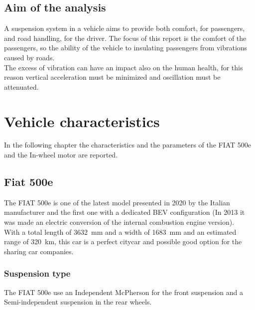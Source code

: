 \documentclass{article}
\numberwithin{equation}{section}
\numberwithin{figure}{section}
\numberwithin{table}{section}
\numberwithin{table}{section}
\begin{document}
\subsection{Aim of the analysis}
A suspension system in a vehicle aims to provide both comfort, for passengers, and road handling, for the driver. The focus of this report is the comfort of the passengers, so the ability of the vehicle to insulating passengers from vibrations caused by roads.\\
The excess of vibration can have an impact also on the human health, for this reason vertical acceleration must be minimized and oscillation must be attenuated.


\section{Vehicle characteristics}
In the following chapter the characteristics and the parameters of the FIAT 500e and the In-wheel motor are reported.

\subsection{Fiat 500e}
The FIAT 500e is one of the latest model presented in 2020 by the Italian manufacturer and the first one with a dedicated BEV configuration (In 2013 it was made an electric conversion of the internal combustion engine version).\\
With a total length of \SI{3632}{\milli\metre} and a width of \SI{1683}{\milli\metre} and an estimated range of \SI{320}{\kilo\metre}, this car is a perfect citycar and possible good option for the sharing car companies.

\subsubsection{Suspension type}
The FIAT 500e use an Independent McPherson for the front suspension and a Semi-independent suspension in the rear wheels.
\end{document}
